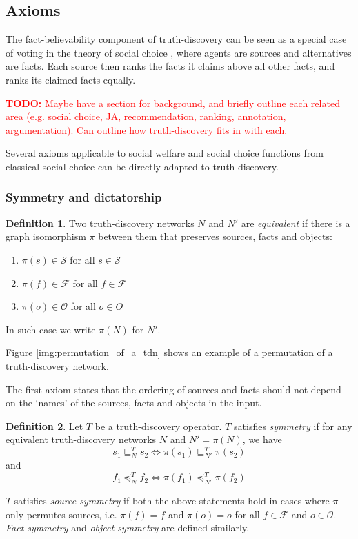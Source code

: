 \documentclass{article}
\theoremstyle{definition} \newtheorem{definition}{Definition}
\theoremstyle{definition} \newtheorem{example}{Example}
\theoremstyle{plain} \newtheorem{axiom}{Axiom}
\theoremstyle{plain} \newtheorem*{remark}{Remark}
\theoremstyle{remark} \newtheorem*{notation}{Notation}
\theoremstyle{plain} \newtheorem{lemma}{Lemma}
\theoremstyle{plain} \newtheorem{theorem}{Theorem}
\theoremstyle{plain} \newtheorem{proposition}{Proposition}
\newcommand{\todo}[1] {
    \textcolor{red}{
        \textbf{TODO:} #1
    }
}
\renewcommand{\S}{\mathcal{S}}  %
\renewcommand{\O}{\mathcal{O}}  %
\newcommand{\F}{\mathcal{F}}
\newcommand{\sle}{\sqsubseteq}
\newcommand{\fle}{\preceq}
\begin{document}
\subsection{Axioms}
\label{sec:axioms}

The fact-believability component of truth-discovery can be seen as a special
case of voting in the theory of social choice \cite{handbook_voting}, where
agents are sources and alternatives are facts. Each source then ranks the facts
it claims above all other facts, and ranks its claimed facts
equally.\footnotemark

\todo{
    Maybe have a section for background, and briefly outline each related area
    (e.g. social choice, JA, recommendation, ranking, annotation,
    argumentation). Can outline how truth-discovery fits in with each.
}


Several axioms applicable to social welfare and social choice functions from
classical social choice can be directly adapted to truth-discovery.

\subsubsection{Symmetry and dictatorship}

\begin{definition}
Two truth-discovery networks $N$ and $N'$ are \emph{equivalent} if there is a
graph isomorphism $\pi$ between them that preserves sources, facts and objects:
\begin{enumerate}
\item $\pi(s) \in \S$ for all $s \in \S$
\item $\pi(f) \in \F$ for all $f \in \F$
\item $\pi(o) \in \O$ for all $o \in O$
\end{enumerate}

In such case we write $\pi(N)$ for $N'$.
\end{definition}

Figure \ref{img:permutation_of_a_tdn} shows an example of a permutation of a
truth-discovery network.

The first axiom states that the ordering of sources and facts should not depend
on the `names' of the sources, facts and objects in the input.

\begin{definition}
Let $T$ be a truth-discovery operator. $T$ satisfies \emph{symmetry} if for
any equivalent truth-discovery networks $N$ and $N' = \pi(N)$, we have
$$ s_1 \sle_N^T s_2 \iff \pi(s_1) \sle_{N'}^T \pi(s_2) $$
and
$$ f_1 \fle_N^T f_2 \iff \pi(f_1) \fle_{N'}^T \pi(f_2) $$

$T$ satisfies \emph{source-symmetry} if both the above statements hold in cases
where $\pi$ only permutes sources, i.e. $\pi(f)=f$ and $\pi(o)=o$ for all $f
\in \F$ and $o \in \O$. \emph{Fact-symmetry} and \emph{object-symmetry} are
defined similarly.
\end{definition}
\end{document}
